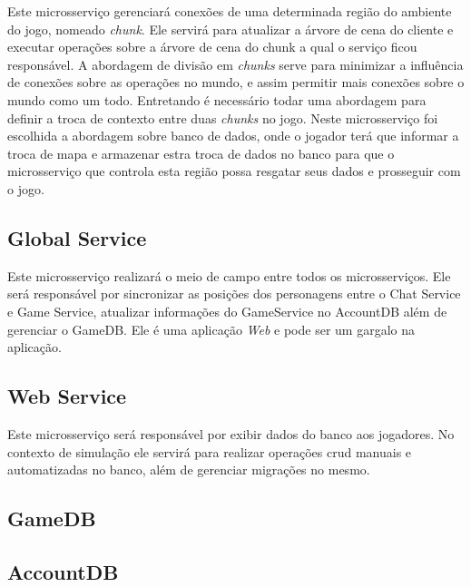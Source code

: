 Este microsserviço gerenciará conexões de uma determinada região do ambiente do jogo, nomeado \textit{chunk}.
%
Ele servirá para atualizar a árvore de cena do cliente e executar operações sobre a árvore de cena do chunk a qual o serviço ficou responsável.
%
A abordagem de divisão em \textit{chunks} serve para minimizar a influência de conexões sobre as operações no mundo, e assim permitir mais conexões sobre o mundo como um todo.
%
Entretando é necessário todar uma abordagem para definir a troca de contexto entre duas \textit{chunks} no jogo.
%
Neste microsserviço foi escolhida a abordagem sobre banco de dados, onde o jogador terá que informar a troca de mapa e armazenar estra troca de dados no banco para que o microsserviço que controla esta região possa resgatar seus dados e prosseguir com o jogo.



\subsection{Global Service}

Este microsserviço realizará o meio de campo entre todos os microsserviços.
%
Ele será responsável por sincronizar as posições dos personagens entre o Chat Service e Game Service, atualizar informações do GameService no AccountDB além de gerenciar o GameDB.
%
Ele é uma aplicação \textit{Web} e pode ser um gargalo na aplicação.

\subsection{Web Service}

Este microsserviço será responsável por exibir dados do banco aos jogadores.
%
No contexto de simulação ele servirá para realizar operações \ac{crud} manuais e automatizadas no banco, além de gerenciar migrações no mesmo.

\subsection{GameDB}

\subsection{AccountDB}
